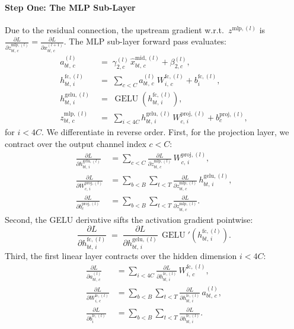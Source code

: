 \documentclass[letterpaper, 10 pt, conference]{ieeeconf}
\newcommand{\pdv}[2]{\frac{\partial #1}{\partial #2}}
\newcommand{\dL}[1]{\pdv{L}{#1}}
\DeclareMathOperator{\gelu}{GELU}
\theoremstyle{definition}
\begin{document}
\paragraph{Step One: The MLP Sub-Layer}
Due to the residual connection, the upstream gradient w.r.t.\ $z^{\text{mlp}, (l)}$ is $\dL{z^{\text{mlp}, (l)}_{bt,\, c}} = \dL{x^{(l+1)}_{bt,\, c}}$. The MLP sub-layer forward pass evaluates:
\begin{align}
  a^{(l)}_{bt,\, c} \;              & =\; \gamma^{(l)}_{2, c}\,\hat{x}^{\text{mid}, (l)}_{bt,\, c} + \beta^{(l)}_{2, c},                        \\
  h^{\text{fc}, (l)}_{bt,\, i} \;   & =\; \sum_{c<C} a^{(l)}_{bt,\, c}\,W^{\text{fc}, (l)}_{i,\, c} + b^{\text{fc}, (l)}_{i},                   \\
  h^{\text{gelu}, (l)}_{bt,\, i} \; & =\; \gelu\left( h^{\text{fc}, (l)}_{bt,\, i} \right),                                                     \\
  z^{\text{mlp}, (l)}_{bt,\, c} \;  & =\; \sum_{i<4C} h^{\text{gelu}, (l)}_{bt,\, i}\,W^{\text{proj}, (l)}_{c,\, i} + b^{\text{proj}, (l)}_{c},
\end{align}
for $i < 4C$. We differentiate in reverse order. First, for the projection layer, we contract over the output channel index $c < C$:
\begin{align}
  \dL{h^{\text{gelu}, (l)}_{bt,\, i}}
   & = \sum_{c<C} \dL{z^{\text{mlp}, (l)}_{bt,\, c}}\,W^{\text{proj}, (l)}_{c,\, i},
  \label{eq:full-dgelu}                                                                          \\
  \dL{W^{\text{proj}, (l)}_{c,\, i}}
   & = \sum_{b<B} \sum_{t<T} \dL{z^{\text{mlp}, (l)}_{bt,\, c}}\,h^{\text{gelu}, (l)}_{bt,\, i},
  \label{eq:full-dwproj}                                                                         \\
  \dL{b^{\text{proj}, (l)}_{c}}
   & = \sum_{b<B} \sum_{t<T} \dL{z^{\text{mlp}, (l)}_{bt,\, c}}.
  \label{eq:full-dbproj}
\end{align}
Second, the GELU derivative sifts the activation gradient pointwise:
\begin{equation}
  \dL{h^{\text{fc}, (l)}_{bt,\, i}} \;=\; \dL{h^{\text{gelu}, (l)}_{bt,\, i}}\,\gelu'\left( h^{\text{fc}, (l)}_{bt,\, i} \right).
  \label{eq:full-dfc}
\end{equation}
Third, the first linear layer contracts over the hidden dimension $i < 4C$:
\begin{align}
  \dL{a^{(l)}_{bt,\, c}}
   & = \sum_{i<4C} \dL{h^{\text{fc}, (l)}_{bt,\, i}}\,W^{\text{fc}, (l)}_{i,\, c},
  \label{eq:full-da}                                                               \\
  \dL{W^{\text{fc}, (l)}_{i,\, c}}
   & = \sum_{b<B} \sum_{t<T} \dL{h^{\text{fc}, (l)}_{bt,\, i}}\,a^{(l)}_{bt,\, c},
  \label{eq:full-dwfc}                                                             \\
  \dL{b^{\text{fc}, (l)}_{i}}
   & = \sum_{b<B} \sum_{t<T} \dL{h^{\text{fc}, (l)}_{bt,\, i}}.
  \label{eq:full-dbfc}
\end{align}
\end{document}
